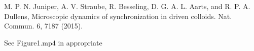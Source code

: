 \documentclass[twocolumn,preprintnumbers,amsmath,amssymb,aps,prx]{revtex4}
\begin{document}
\begin{thebibliography}{99}
      
 M. P. N. Juniper, A. V. Straube, R. Besseling, D. G. A. L. Aarts, and R. P. A. Dullens, Microscopic dynamics of synchronization in driven colloids. Nat. Commun. 6, 7187 (2015).

 See Figure1.mp4 in appropriate %













\end{thebibliography}
\end{document}
